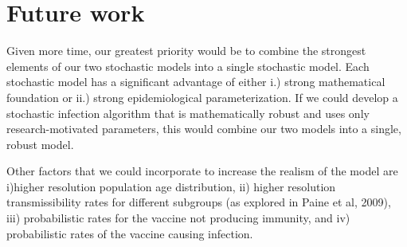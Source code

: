 \documentclass[titlepage]{article}
\begin{document}
\section{Future work}
Given more time, our greatest priority would be to combine the strongest elements of our two stochastic models into a single stochastic model. Each stochastic model has a significant advantage of either i.)  strong mathematical foundation or ii.) strong epidemiological parameterization. If we could develop a stochastic infection algorithm that is mathematically robust and uses only research-motivated parameters, this would combine our two models into a single, robust model.

Other factors that we could incorporate to increase the realism of the model are i)higher resolution population age distribution, ii) higher resolution transmissibility rates for different subgroups (as explored in Paine et al, 2009), iii) probabilistic rates for the vaccine not producing immunity, and iv) probabilistic rates of the vaccine causing infection.
\end{document}
